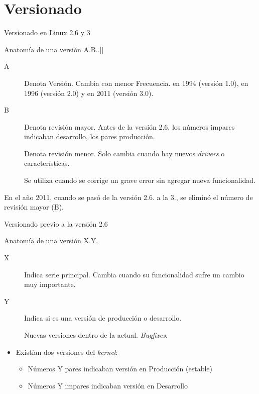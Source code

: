 \section{Versionado}
\begin{frame}{Versionado en Linux 2.6 y 3}
  
  \begin{block}{Anatomía de una versión}
    \alert{A}.\alert{B}..[]
  \end{block}

    { \tiny
  \begin{description}

  \item[\alert{A}] Denota Versión. Cambia con menor Frecuencia. en 1994
    (versión 1.0), en 1996 (versión 2.0) y en 2011 (versión 3.0).

  \item[\alert{B}] Denota revisión mayor. Antes de la versión 2.6, los
    números impares indicaban desarrollo, los pares producción.

  \item[] Denota revisión menor. Solo cambia cuando hay nuevos
    \textit{drivers} o características.

  \item[] Se utiliza cuando se corrige un grave error sin
    agregar nueva funcionalidad.
  \end{description} }

  \vfill \pause En el año 2011, cuando se pasó de la versión
  \alert{2}.\alert{6}. a la \alert{3}., se
  eliminó el número de revisión mayor (\alert{B})\cite{Torvalds2011}.

\end{frame}

\begin{frame}{Versionado previo a la versión 2.6}
  \begin{block}{Anatomía de una versión}
    \alert{X}.\alert{Y}.
  \end{block}
  \begin{description}

  \item[\alert{X}] Indica serie principal. Cambia cuando su funcionalidad
    sufre un cambio muy importante.

  \item[\alert{Y}] Indica si es una versión de producción o desarrollo.
  \item[] Nuevas versiones dentro de la
    actual. \textit{Bugfixes}.
  \end{description}
  \begin{itemize}
  \item Existían dos versiones del \textit{kernel}:
    \begin{itemize}
    \item Números \alert{Y} pares indicaban versión en Producción (estable)
    \item Números \alert{Y} impares indicaban versión en Desarrollo
    \end{itemize}    
  \end{itemize}
\end{frame}

